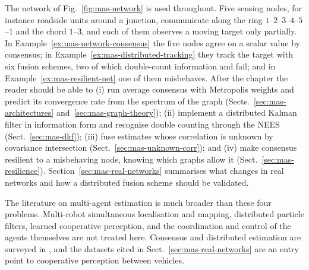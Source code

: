 The network of Fig.~\ref{fig:mas-network} is used throughout. Five sensing nodes, for instance roadside units around a junction, communicate along the ring $1$--$2$--$3$--$4$--$5$--$1$ and the chord $1$--$3$, and each of them observes a moving target only partially. In Example~\ref{ex:mas-network-consensus} the five nodes agree on a scalar value by consensus; in Example~\ref{ex:mas-distributed-tracking} they track the target with six fusion schemes, two of which double-count information and fail; and in Example~\ref{ex:mas-resilient-net} one of them misbehaves. After the chapter the reader should be able to (i) run average consensus with Metropolis weights and predict its convergence rate from the spectrum of the graph (Sects.~\ref{sec:mas-architectures} and~\ref{sec:mas-graph-theory}); (ii) implement a distributed Kalman filter in information form and recognise double counting through the NEES (Sect.~\ref{sec:mas-dkf}); (iii) fuse estimates whose correlation is unknown by covariance intersection (Sect.~\ref{sec:mas-unknown-corr}); and (iv) make consensus resilient to a misbehaving node, knowing which graphs allow it (Sect.~\ref{sec:mas-resilience}). Section~\ref{sec:mas-real-networks} summarises what changes in real networks and how a distributed fusion scheme should be validated.

The literature on multi-agent estimation is much broader than these four problems. Multi-robot simultaneous localisation and mapping, distributed particle filters, learned cooperative perception, and the coordination and control of the agents themselves are not treated here. Consensus and distributed estimation are surveyed in \cite{olfatisaber2007_consensus,ren2005_consensus}, and the datasets cited in Sect.~\ref{sec:mas-real-networks} are an entry point to cooperative perception between vehicles.

